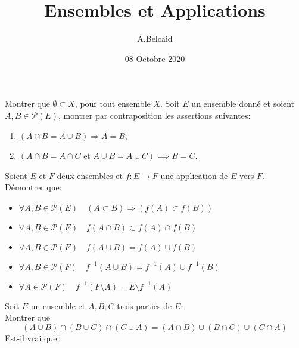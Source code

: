 \documentclass[10pt, a4paper, twocolumn]{homework}
\title{Ensembles et Applications}
\date{08 Octobre 2020}
\author{A.Belcaid}
\begin{document}
\maketitle

Montrer que $\emptyset \subset X$, pour tout ensemble $X$.
  Soit $E$ un ensemble donné et soient $A,B \in \mathcal{P}(E)$,  montrer par contraposition les assertions suivantes:
\begin{enumerate}
\item $(A\cap B=A\cup B)\Rightarrow A=B$,
\item $ (A\cap B=A\cap C \text{ et } A\cup B=A\cup C)\implies B=C$.
\end{enumerate}
Soient $E$ et $F$ deux ensembles et $f:E\rightarrow F$ une application de $E$ vers $F$.\\

Démontrer que:

\begin{itemize}
  \item $\forall A,B \in \mathcal{P}(E) \quad (A\subset B)\Rightarrow (f(A)\subset f(B))$
  \item $\forall A,B \in \mathcal{P}(E) \quad f(A\cap B)\subset f(A)\cap f(B)$
  \item $\forall A,B \in \mathcal{P}(E) \quad f(A\cup B) = f(A)\cup f(B)$
  \item $\forall A,B \in \mathcal{P}(F) \quad f^{-1}(A\cup B) = f^{-1}(A)\cup f^{-1}(B)$
  \item $\forall A \in \mathcal{P}(F) \quad f^{-1}(F\setminus A)=E\setminus f^{-1}(A)$
\end{itemize}

Soit $E$ un ensemble et $A, B, C$ trois parties de $E$.\\
Montrer que
$$ (A \cup B) \cap (B \cup C) \cap (C \cup A) =
(A \cap B) \cup (B \cap C) \cup (C \cap A)$$
Est-il vrai que:
\end{document}
